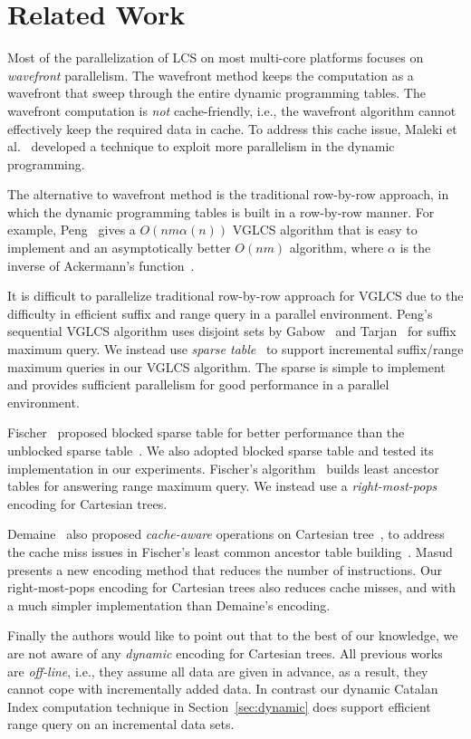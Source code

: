 \section{Related Work} \label{sec:RelatedWork}

Most of the parallelization of LCS on most multi-core platforms
focuses on {\em wavefront} parallelism.  The wavefront method keeps
the computation as a wavefront that sweep through the entire dynamic
programming tables.  The wavefront computation is {\em not}
cache-friendly, i.e., the wavefront algorithm cannot effectively keep
the required data in cache.  To address this cache issue, Maleki et
al.~\cite{Maleki2016EfficientPU} developed a technique to exploit more
parallelism in the dynamic programming.

The alternative to wavefront method is the traditional row-by-row
approach, in which the dynamic programming tables is built in a
row-by-row manner.  For example, Peng~\cite{Peng2011TheLC} gives a
$O(nm \alpha(n))$ VGLCS algorithm that is easy to implement and an
asymptotically better $O(nm)$ algorithm, where $\alpha$ is the inverse
of Ackermann's function~\cite{Banachowski1980ACT}.

It is difficult to parallelize traditional row-by-row approach for
VGLCS due to the difficulty in efficient suffix and range query in a
parallel environment.  Peng's sequential VGLCS algorithm uses disjoint
sets by Gabow~\cite{Gabow1983ALA} and
Tarjan~\cite{Tarjan1975EfficiencyOA} for suffix maximum query.  We
instead use {\em sparse table}~\cite{Berkman1993RecursiveSP} to
support incremental suffix/range maximum queries in our VGLCS
algorithm.  The sparse is simple to implement and provides sufficient
parallelism for good performance in a parallel environment.

Fischer~\cite{Fischer2006TheoreticalAP} proposed blocked sparse table
for better performance than the unblocked sparse
table~\cite{Berkman1993RecursiveSP}.  We also adopted blocked sparse
table and tested its implementation in our experiments.  Fischer's
algorithm~\cite{Fischer2006TheoreticalAP} builds least ancestor tables
for answering range maximum query.  We instead use a {\em
  right-most-pops} encoding for Cartesian trees.

Demaine~\cite{Demaine2009OnCT} also proposed {\em cache-aware}
operations on Cartesian tree~\cite{Vuillemin1980AUL}, to address the
cache miss issues in Fischer's least common ancestor table
building~\cite{Fischer2006TheoreticalAP}.
Masud~\cite{Hasan2010CacheOA} presents a new encoding method that
reduces the number of instructions.  Our right-most-pops encoding for
Cartesian trees also reduces cache misses, and with a much simpler
implementation than Demaine's encoding.

Finally the authors would like to point out that to the best of our
knowledge, we are not aware of any {\em dynamic} encoding for
Cartesian trees.  All previous works are {\em off-line}, i.e., they
assume all data are given in advance, as a result, they cannot cope
with incrementally added data.  In contrast our dynamic Catalan Index
computation technique in Section~\ref{sec:dynamic} does support
efficient range query on an incremental data sets.
